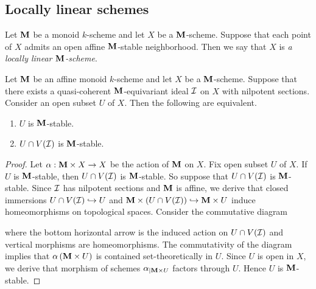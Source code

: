 \subsection{Locally linear schemes}

\begin{definition}
Let $\mathbf{M}$ be a monoid $k$-scheme and let $X$ be a $\mathbf{M}$-scheme. Suppose that each point of $X$ admits an open affine $\mathbf{M}$-stable neighborhood. Then we say that $X$ is \textit{a locally linear $\mathbf{M}$-scheme}.
\end{definition}

\begin{proposition}\label{proposition:monoid_open_stable_correspondence}
Let $\mathbf{M}$ be an affine monoid $k$-scheme and let $X$ be a $\mathbf{M}$-scheme. Suppose that there exists a quasi-coherent $\mathbf{M}$-equivariant ideal ${\mathcal I}$ on $X$ with nilpotent sections. Consider an open subset $U$ of $X$. Then the following are equivalent.
\begin{enumerate}[label=\emph{\textbf{(\arabic*)}}, leftmargin=1.5em]
\item $U$ is $\mathbf{M}$-stable.
\item $U\cap V({\mathcal I})$ is $\mathbf{M}$-stable.
\end{enumerate}
\end{proposition}
\begin{proof}
Let $\alpha:\mathbf{M} \times X\rightarrow X$ be the action of $\mathbf{M}$ on $X$. Fix open subset $U$ of $X$. If $U$ is $\mathbf{M}$-stable, then $U\cap V({\mathcal I})$ is $\mathbf{M}$-stable. So suppose that $U\cap V({\mathcal I})$ is $\mathbf{M}$-stable. Since ${\mathcal I}$ has nilpotent sections and $\mathbf{M}$ is affine, we derive that closed immersions $U\cap V({\mathcal I})\hookrightarrow U$ and $\mathbf{M}\times \left(U\cap V({\mathcal I})\right) \hookrightarrow \mathbf{M}\times U$ induce homeomorphisms on topological spaces. Consider the commutative diagram
\begin{center}
\end{center}
where the bottom horizontal arrow is the induced action on $U\cap V({\mathcal I})$ and vertical morphisms are homeomorphisms. The commutativity of the diagram implies that $\alpha\left(\mathbf{M}\times U\right)$ is contained set-theoretically in $U$. Since $U$ is open in $X$, we derive that morphism of schemes $\alpha_{\mid \mathbf{M}\times U}$ factors through $U$. Hence $U$ is $\mathbf{M}$-stable.
\end{proof}

